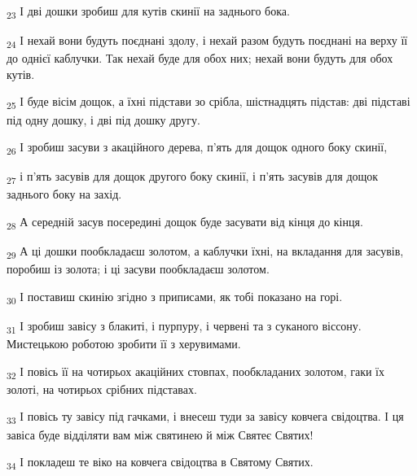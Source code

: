 \begin{tcolorbox}
\textsubscript{23} І дві дошки зробиш для кутів скинії на заднього бока.
\end{tcolorbox}
\begin{tcolorbox}
\textsubscript{24} І нехай вони будуть поєднані здолу, і нехай разом будуть поєднані на верху її до однієї каблучки. Так нехай буде для обох них; нехай вони будуть для обох кутів.
\end{tcolorbox}
\begin{tcolorbox}
\textsubscript{25} І буде вісім дощок, а їхні підстави зо срібла, шістнадцять підстав: дві підставі під одну дошку, і дві під дошку другу.
\end{tcolorbox}
\begin{tcolorbox}
\textsubscript{26} І зробиш засуви з акаційного дерева, п'ять для дощок одного боку скинії,
\end{tcolorbox}
\begin{tcolorbox}
\textsubscript{27} і п'ять засувів для дощок другого боку скинії, і п'ять засувів для дощок заднього боку на захід.
\end{tcolorbox}
\begin{tcolorbox}
\textsubscript{28} А середній засув посередині дощок буде засувати від кінця до кінця.
\end{tcolorbox}
\begin{tcolorbox}
\textsubscript{29} А ці дошки пообкладаєш золотом, а каблучки їхні, на вкладання для засувів, поробиш із золота; і ці засуви пообкладаєш золотом.
\end{tcolorbox}
\begin{tcolorbox}
\textsubscript{30} І поставиш скинію згідно з приписами, як тобі показано на горі.
\end{tcolorbox}
\begin{tcolorbox}
\textsubscript{31} І зробиш завісу з блакиті, і пурпуру, і червені та з суканого віссону. Мистецькою роботою зробити її з херувимами.
\end{tcolorbox}
\begin{tcolorbox}
\textsubscript{32} І повісь її на чотирьох акаційних стовпах, пообкладаних золотом, гаки їх золоті, на чотирьох срібних підставах.
\end{tcolorbox}
\begin{tcolorbox}
\textsubscript{33} І повісь ту завісу під гачками, і внесеш туди за завісу ковчега свідоцтва. І ця завіса буде відділяти вам між святинею й між Святеє Святих!
\end{tcolorbox}
\begin{tcolorbox}
\textsubscript{34} І покладеш те віко на ковчега свідоцтва в Святому Святих.
\end{tcolorbox}
